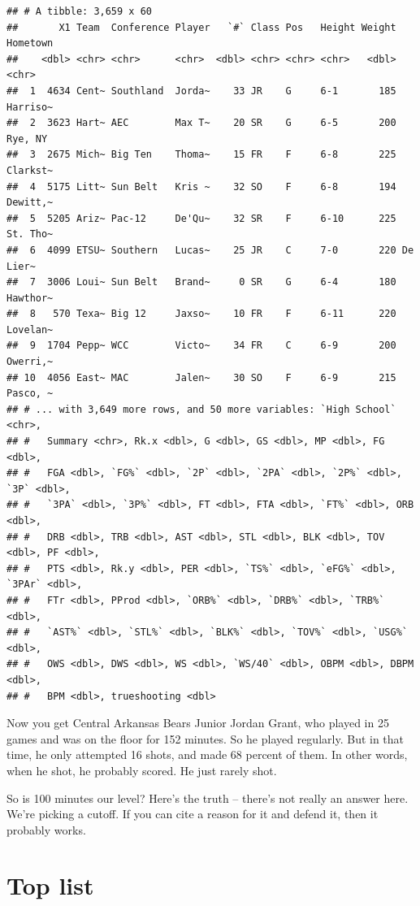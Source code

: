 \documentclass[]{book}
\begin{document}
\begin{verbatim}
## # A tibble: 3,659 x 60
##       X1 Team  Conference Player   `#` Class Pos   Height Weight Hometown
##    <dbl> <chr> <chr>      <chr>  <dbl> <chr> <chr> <chr>   <dbl> <chr>   
##  1  4634 Cent~ Southland  Jorda~    33 JR    G     6-1       185 Harriso~
##  2  3623 Hart~ AEC        Max T~    20 SR    G     6-5       200 Rye, NY 
##  3  2675 Mich~ Big Ten    Thoma~    15 FR    F     6-8       225 Clarkst~
##  4  5175 Litt~ Sun Belt   Kris ~    32 SO    F     6-8       194 Dewitt,~
##  5  5205 Ariz~ Pac-12     De'Qu~    32 SR    F     6-10      225 St. Tho~
##  6  4099 ETSU~ Southern   Lucas~    25 JR    C     7-0       220 De Lier~
##  7  3006 Loui~ Sun Belt   Brand~     0 SR    G     6-4       180 Hawthor~
##  8   570 Texa~ Big 12     Jaxso~    10 FR    F     6-11      220 Lovelan~
##  9  1704 Pepp~ WCC        Victo~    34 FR    C     6-9       200 Owerri,~
## 10  4056 East~ MAC        Jalen~    30 SO    F     6-9       215 Pasco, ~
## # ... with 3,649 more rows, and 50 more variables: `High School` <chr>,
## #   Summary <chr>, Rk.x <dbl>, G <dbl>, GS <dbl>, MP <dbl>, FG <dbl>,
## #   FGA <dbl>, `FG%` <dbl>, `2P` <dbl>, `2PA` <dbl>, `2P%` <dbl>, `3P` <dbl>,
## #   `3PA` <dbl>, `3P%` <dbl>, FT <dbl>, FTA <dbl>, `FT%` <dbl>, ORB <dbl>,
## #   DRB <dbl>, TRB <dbl>, AST <dbl>, STL <dbl>, BLK <dbl>, TOV <dbl>, PF <dbl>,
## #   PTS <dbl>, Rk.y <dbl>, PER <dbl>, `TS%` <dbl>, `eFG%` <dbl>, `3PAr` <dbl>,
## #   FTr <dbl>, PProd <dbl>, `ORB%` <dbl>, `DRB%` <dbl>, `TRB%` <dbl>,
## #   `AST%` <dbl>, `STL%` <dbl>, `BLK%` <dbl>, `TOV%` <dbl>, `USG%` <dbl>,
## #   OWS <dbl>, DWS <dbl>, WS <dbl>, `WS/40` <dbl>, OBPM <dbl>, DBPM <dbl>,
## #   BPM <dbl>, trueshooting <dbl>
\end{verbatim}

Now you get Central Arkansas Bears Junior Jordan Grant, who played in 25 games and was on the floor for 152 minutes. So he played regularly. But in that time, he only attempted 16 shots, and made 68 percent of them. In other words, when he shot, he probably scored. He just rarely shot.

So is 100 minutes our level? Here's the truth -- there's not really an answer here. We're picking a cutoff. If you can cite a reason for it and defend it, then it probably works.

\hypertarget{top-list}{%
\section{Top list}\label{top-list}}
\end{document}
